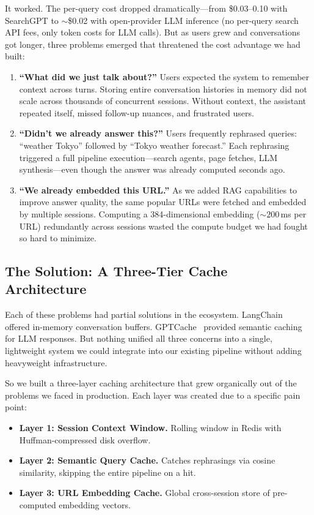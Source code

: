 \documentclass[conference]{IEEEtran}
\begin{document}
It worked. The per-query cost dropped dramatically---from \$0.03--0.10 with SearchGPT to ${\sim}$\$0.02 with open-provider LLM inference (no per-query search API fees, only token costs for LLM calls). But as users grew and conversations got longer, three problems emerged that threatened the cost advantage we had built:

\begin{enumerate}
\item \textbf{``What did we just talk about?''} Users expected the system to remember context across turns. Storing entire conversation histories in memory did not scale across thousands of concurrent sessions. Without context, the assistant repeated itself, missed follow-up nuances, and frustrated users.

\item \textbf{``Didn't we already answer this?''} Users frequently rephrased queries: ``weather Tokyo'' followed by ``Tokyo weather forecast.'' Each rephrasing triggered a full pipeline execution---search agents, page fetches, LLM synthesis---even though the answer was already computed seconds ago.

\item \textbf{``We already embedded this URL.''} As we added RAG capabilities to improve answer quality, the same popular URLs were fetched and embedded by multiple sessions. Computing a 384-dimensional embedding (${\sim}200$\,ms per URL) redundantly across sessions wasted the compute budget we had fought so hard to minimize.
\end{enumerate}

\subsection{The Solution: A Three-Tier Cache Architecture}

Each of these problems had partial solutions in the ecosystem. LangChain~\cite{langchain2023} offered in-memory conversation buffers. GPTCache~\cite{gptcache2023} provided semantic caching for LLM responses. But nothing unified all three concerns into a single, lightweight system we could integrate into our existing pipeline without adding heavyweight infrastructure.

So we built a three-layer caching architecture that grew organically out of the problems we faced in production. Each layer was created due to a specific pain point:

\begin{itemize}
\item \textbf{Layer 1: Session Context Window.} Rolling window in Redis with Huffman-compressed disk overflow.
\item \textbf{Layer 2: Semantic Query Cache.} Catches rephrasings via cosine similarity, skipping the entire pipeline on a hit.
\item \textbf{Layer 3: URL Embedding Cache.} Global cross-session store of pre-computed embedding vectors.
\end{itemize}
\end{document}
